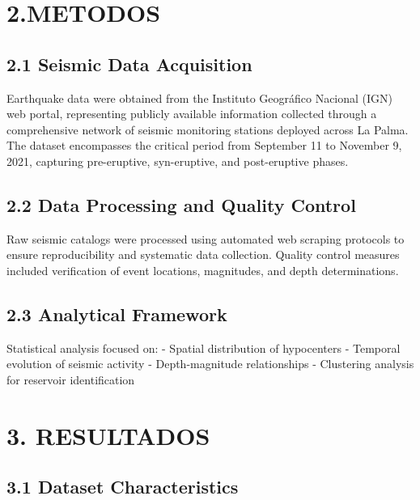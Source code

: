 \documentclass[
  spanish,
  letterpaper,
]{book}
\begin{document}

\chapter{2.METODOS}\label{metodos}

\section{2.1 Seismic Data Acquisition}\label{seismic-data-acquisition}

Earthquake data were obtained from the Instituto Geográfico Nacional
(IGN) web portal, representing publicly available information collected
through a comprehensive network of seismic monitoring stations deployed
across La Palma. The dataset encompasses the critical period from
September 11 to November 9, 2021, capturing pre-eruptive, syn-eruptive,
and post-eruptive phases.

\section{2.2 Data Processing and Quality
Control}\label{data-processing-and-quality-control}

Raw seismic catalogs were processed using automated web scraping
protocols to ensure reproducibility and systematic data collection.
Quality control measures included verification of event locations,
magnitudes, and depth determinations.

\section{2.3 Analytical Framework}\label{analytical-framework}

Statistical analysis focused on: - Spatial distribution of hypocenters -
Temporal evolution of seismic activity - Depth-magnitude relationships -
Clustering analysis for reservoir identification


\chapter{3. RESULTADOS}\label{resultados}

\section{3.1 Dataset Characteristics}\label{dataset-characteristics}
\end{document}
